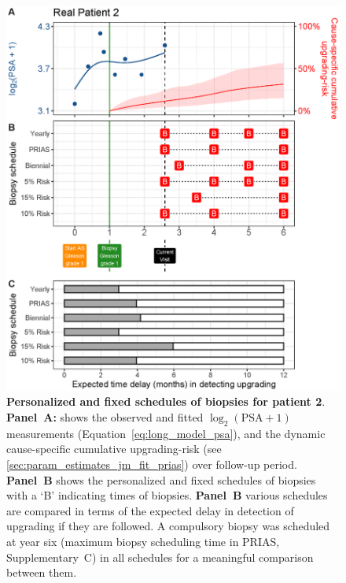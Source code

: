 \begin{figure}
\centerline{\includegraphics[width=\columnwidth]{images/demo_pat2_supp.eps}}
\caption{\textbf{Personalized and fixed schedules of biopsies for patient 2}. \textbf{Panel~A:} shows the observed and fitted $\log_2(\mbox{PSA} + 1)$ measurements (Equation~\ref{eq:long_model_psa}), and the dynamic cause-specific cumulative upgrading-risk (see \ref{sec:param_estimates_jm_fit_prias}) over follow-up period. \textbf{Panel~B} shows the personalized and fixed schedules of biopsies with a `B' indicating times of biopsies. \textbf{Panel~B} various schedules are compared in terms of the expected delay in detection of upgrading if they are followed. A compulsory biopsy was scheduled at year six (maximum biopsy scheduling time in PRIAS, Supplementary~C) in all schedules for a meaningful comparison between them.}
\label{fig:demo_pat2_supp}
\end{figure}

